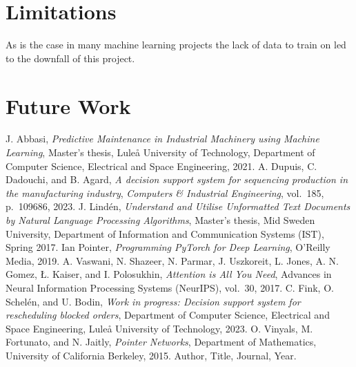 \documentclass[12pt,a4paper]{report}
\begin{document}
\section{Limitations}
    As is the case in many machine learning projects the lack of data to train on led to the downfall of this project.
\section{Future Work}


\begin{thebibliography}{99}
J. Abbasi, \textit{Predictive Maintenance in Industrial Machinery using Machine Learning}, 
Master’s thesis, Luleå University of Technology, Department of Computer Science, Electrical and Space Engineering, 2021.
A. Dupuis, C. Dadouchi, and B. Agard, 
        \textit{A decision support system for sequencing production in the manufacturing industry},
\textit{Computers \& Industrial Engineering}, vol.~185, p.~109686, 2023. 
 J. Lindén, 
    \textit{Understand and Utilise Unformatted Text Documents by Natural Language Processing Algorithms}, 
    Master’s thesis, Mid Sweden University, Department of Information and Communication Systems (IST), Spring 2017.
 Ian Pointer,
\textit{Programming PyTorch for Deep Learning},
O'Reilly Media, 2019.
A. Vaswani, N. Shazeer, N. Parmar, J. Uszkoreit, L. Jones, 
A. N. Gomez, Ł. Kaiser, and I. Polosukhin, 
\textit{Attention is All You Need}, Advances in Neural Information Processing Systems (NeurIPS), vol.~30, 2017.
C. Fink, O. Schelén, and U. Bodin, 
\textit{Work in progress: Decision support system for rescheduling blocked orders}, 
Department of Computer Science, Electrical and Space Engineering, Luleå University of Technology, 2023.
 O. Vinyals, M. Fortunato, and N. Jaitly, 
    \textit{Pointer Networks}, 
    Department of Mathematics, University of California Berkeley, 2015.
 Author, Title, Journal, Year.
\end{thebibliography}
\end{document}
